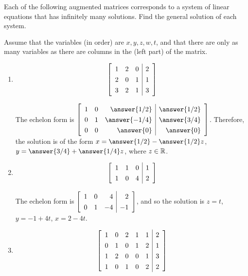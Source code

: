 \documentclass{ximera}
\author{Zack Reed}
\begin{document}
\begin{exercise}

    Each of the following augmented matrices corresponds to a system of linear equations that has infinitely many solutions. Find the general solution of each system.

    Assume that the variables (in order) are $x, y, z, w, t$, and that there are only as many variables as there are columns in the (left part) of the matrix.

    \begin{enumerate}

        \item 
        \begin{equation*}    
            \startmat{rrr|r}
              1 & 2 & 0 & 2 \\
              2 & 0 & 1 & 1 \\
              3 & 2 & 1 & 3
            \stopmat
        \end{equation*}

        The echelon form is
        $\def\arraystretch{1.3}
        \startmat{rrr|r}
          1 & 0 & \answer{1/2} & \answer{1/2} \\
          0 & 1 & \answer{-1/4} & \answer{3/4} \\
          0 & 0 & \answer{0} & \answer{0}
        \stopmat$. Therefore, the solution is of the form $x=\answer{1/2}-\answer{1/2}z$, $y=\answer{3/4}+\answer{1/4}z$, where $z\in \mathbb{R}$.

        \item 
        \begin{equation*}
            \startmat{rrr|r}
              1 & 1 & 0 & 1 \\
              1 & 0 & 4 & 2
            \stopmat
        \end{equation*}

        The echelon form is 
        $\startmat{rrr|r}
          1 & 0 & 4 & 2 \\
          0 & 1 & -4 & -1
        \stopmat$, and so the solution is $z=t$, $y=-1+4t$, $x=2-4t$.


        \item 
        \begin{equation*}
            \startmat{rrrrr|r}
              1 & 0 & 2 & 1 & 1 & 2 \\
              0 & 1 & 0 & 1 & 2 & 1 \\
              1 & 2 & 0 & 0 & 1 & 3 \\
              1 & 0 & 1 & 0 & 2 & 2
            \stopmat
        \end{equation*}


\end{enumerate}
\end{exercise}
\end{document}
